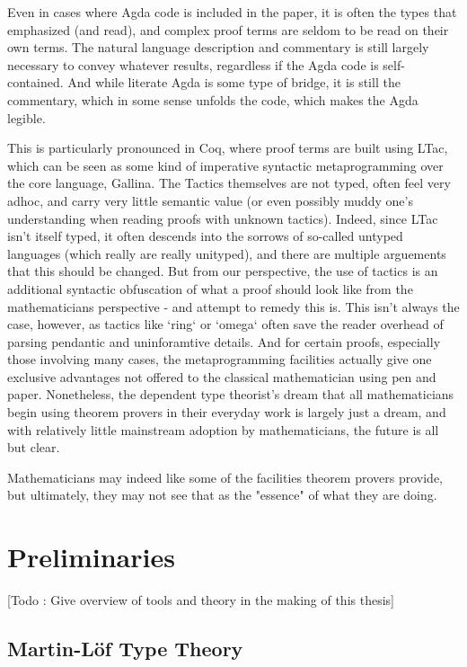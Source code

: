 \documentclass[11pt, a4paper]{article}
\begin{document}
Even in cases where Agda code is included in the paper, it is often the types
that emphasized (and read), and complex proof terms are seldom to be read on
their own terms. The natural language description and commentary is still
largely necessary to convey whatever results, regardless if the Agda code is
self-contained. And while literate Agda is some type of bridge, it is still the
commentary, which in some sense unfolds the code, which makes the Agda legible.

This is particularly pronounced in Coq, where proof terms are built using LTac,
which can be seen as some kind of imperative syntactic metaprogramming over the
core language, Gallina. The Tactics themselves are not typed, often feel very
adhoc, and carry very little semantic value (or even possibly muddy one's
understanding when reading proofs with unknown tactics). Indeed, since LTac
isn't itself typed, it often descends into the sorrows of so-called untyped
languages (which really are really unityped), and there are multiple arguements
that this should be changed. But from our perspective, the use of tactics is an
additional syntactic obfuscation of what a proof should look like from the
mathematicians perspective - and attempt to remedy this is. This isn't always
the case, however, as tactics like `ring` or `omega` often save the reader
overhead of parsing pendantic and uninforamtive details. And for certain proofs,
especially those involving many cases, the metaprogramming facilities actually
give one exclusive advantages not offered to the classical mathematician using
pen and paper. Nonetheless, the dependent type theorist's dream that all
mathematicians begin using theorem provers in their everyday work is largely
just a dream, and with relatively little mainstream adoption by mathematicians,
the future is all but clear.

Mathematicians may indeed like some of the facilities theorem provers provide,
but ultimately, they may not see that as the "essence" of what they are doing.


\section{Preliminaries}

[Todo : Give overview of tools and theory in the making of this thesis]

\subsection{Martin-Löf Type Theory}
\end{document}
